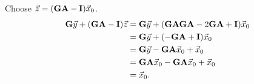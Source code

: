 \begin{Theorem}{}{}
\begin{enumerate}[(1)]
              Choose $ \vec{z}=(\mathbf{GA}-\mathbf{I})\vec{x}_0 $.
              \begin{align*}
                  \mathbf{G}\vec{y}+(\mathbf{GA}-\mathbf{I})\vec{z}
                   & =\mathbf{G}\vec{y}+(\mathbf{GAGA}-2 \mathbf{GA}+\mathbf{I})\vec{x}_0      \\
                   & =\mathbf{G}\vec{y}+(-\mathbf{GA}+\mathbf{I})\vec{x}_0                     \\
                   & =\mathbf{G}\vec{y}-\mathbf{GA}\vec{x}_0+\vec{x}_0                      \\
                   & =\mathbf{G}\mathbf{A}\vec{x}_0-\mathbf{G}\mathbf{A}\vec{x}_0+\vec{x}_0 \\
                   & =\vec{x}_0.
              \end{align*}
    \end{enumerate}
\end{Theorem}
